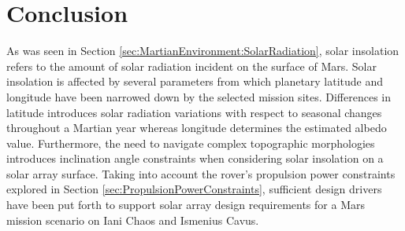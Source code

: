 \section{Conclusion}
As was seen in Section \ref{sec:MartianEnvironment:SolarRadiation}, solar insolation refers to the amount of solar radiation incident on the surface of Mars. Solar insolation is affected by several parameters from which planetary latitude and longitude have been narrowed down by the selected mission sites. Differences in latitude introduces solar radiation variations with respect to seasonal changes throughout a Martian year whereas longitude determines the estimated albedo value. Furthermore, the need to navigate complex topographic morphologies introduces inclination angle constraints when considering solar insolation on a solar array surface. Taking into account the rover's propulsion power constraints explored in Section \ref{sec:PropulsionPowerConstraints}, sufficient design drivers have been put forth to support solar array design requirements for a Mars mission scenario on Iani Chaos and Ismenius Cavus.
